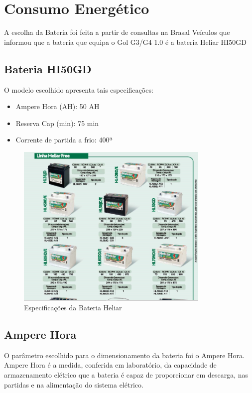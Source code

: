 \section{Consumo Energético}
 
A escolha da Bateria foi feita a partir de consultas na Brasal Veículos que informou que a bateria que equipa o Gol G3/G4 1.0 é a bateria Heliar HI50GD
 
\subsection{Bateria HI50GD}

O modelo escolhido apresenta tais especificações:

\begin{itemize}
	\item Ampere Hora (AH): 50 AH
	\item Reserva Cap (min): 75 min
	\item Corrente de partida a frio: 400ª
\end{itemize}

\begin{figure}[h]
  \centering
  \includegraphics[width=350px, scale=1]{figuras/especificacoes2}
  \caption{Especificações da Bateria Heliar}
\label{fig:especificacoes2}
\end{figure}
	 
\subsection{Ampere Hora}

O parâmetro escolhido para o dimensionamento da bateria foi o Ampere Hora. Ampere Hora é a medida, conferida em laboratório, da capacidade de armazenamento elétrico que a bateria é capaz de proporcionar em descarga, nas partidas e na alimentação do sistema elétrico.

